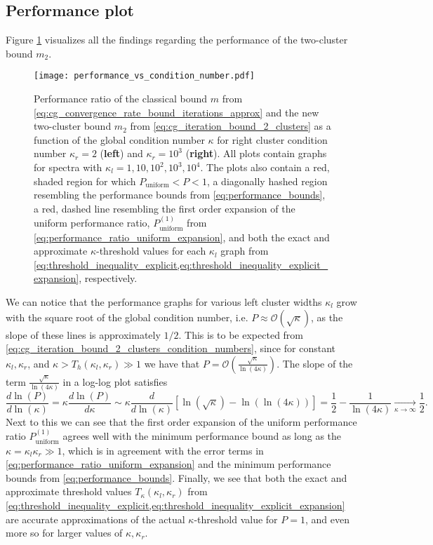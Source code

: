 \subsection{Performance plot}
Figure \ref{fig:two_cluster_bound_performance} visualizes all the findings regarding the performance of the two-cluster bound $m_2$. 
\begin{figure}[H]
    \centering
    \texttt{[image: performance\_vs\_condition\_number.pdf]}
    \caption{Performance ratio of the classical bound $m$ from \cref{eq:cg_convergence_rate_bound_iterations_approx} and the new two-cluster bound $m_2$ from \cref{eq:cg_iteration_bound_2_clusters} as a function of the global condition number $\kappa$ for right cluster condition number $\kappa_r = 2$ (\textbf{left}) and $\kappa_r = 10^3$ (\textbf{right}). All plots contain graphs for spectra with $\kappa_l = 1, 10, 10^2, 10^3, 10^4$. The plots also contain a red, shaded region for which $P_{\text{uniform}} < P < 1$, a diagonally hashed region resembling the performance bounds from \cref{eq:performance_bounds}, a red, dashed line resembling the first order expansion of the uniform performance ratio, $P^{(1)}_{\text{uniform}}$ from \cref{eq:performance_ratio_uniform_expansion}, and both the exact and approximate $\kappa$-threshold values for each $\kappa_l$ graph from \cref{eq:threshold_inequality_explicit,eq:threshold_inequality_explicit_expansion}, respectively.}
    \label{fig:two_cluster_bound_performance}
\end{figure}
We can notice that the performance graphs for various left cluster widths $\kappa_l$ grow with the square root of the global condition number, i.e. $P \approx \mathcal{O}(\sqrt{\kappa})$, as the slope of these lines is approximately $1/2$. This is to be expected from \cref{eq:cg_iteration_bound_2_clusters_condition_numbers}, since for constant $\kappa_l,\kappa_r$, and $\kappa > T_h(\kappa_l, \kappa_r) \gg 1$ we have that $P = \mathcal{O}\left(\frac{\sqrt{\kappa}}{\ln(4\kappa)}\right)$. The slope of the term $\frac{\sqrt{\kappa}}{\ln(4\kappa)}$ in a log-log plot satisfies
\[
    \frac{d\ln(P)}{d\ln(\kappa)} =\kappa\frac{d\ln(P)}{d\kappa} \sim \kappa\frac{d}{d\ln(\kappa)} \left[\ln(\sqrt{\kappa}) - \ln(\ln(4\kappa))\right] = \frac{1}{2} - \frac{1}{\ln(4\kappa)} \underset{\kappa\to\infty}{\longrightarrow} \frac{1}{2}.
\]
Next to this we can see that the first order expansion of the uniform performance ratio $P^{(1)}_{\text{uniform}}$ agrees well with the minimum performance bound as long as the $\kappa = \kappa_l\kappa_r \gg 1$, which is in agreement with the error terms in \cref{eq:performance_ratio_uniform_expansion} and the minimum performance bounds from \cref{eq:performance_bounds}. Finally, we see that both the exact and approximate threshold values $T_{\kappa}(\kappa_l, \kappa_r)$ from \cref{eq:threshold_inequality_explicit,eq:threshold_inequality_explicit_expansion} are accurate approximations of the actual $\kappa$-threshold value for $P=1$, and even more so for larger values of $\kappa,\kappa_r$.

